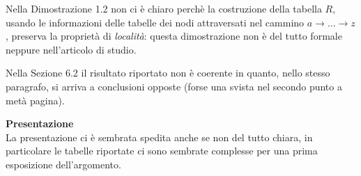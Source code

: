 \documentclass[11pt]{article}
\begin{document}
\begin{formalreport}
  Nella Dimostrazione 1.2 non ci \`e chiaro perch\`e la costruzione
  della tabella $R$, usando le informazioni delle tabelle dei nodi
  attraversati nel cammino $a \rightarrow \ldots \rightarrow z$,
  preserva la propriet\`a di \emph{localit\`a}: questa dimostrazione
  non \`e del tutto formale neppure nell'articolo di studio.

  Nella Sezione 6.2 il risultato riportato non \`e coerente in quanto,
  nello stesso paragrafo, si arriva a conclusioni opposte (forse una
  svista nel secondo punto a met\`a pagina).

  \textbf{Presentazione}\\
  La presentazione ci \`e sembrata spedita anche se non del tutto
  chiara, in particolare le tabelle riportate ci sono sembrate
  complesse per una prima esposizione dell'argomento.
 
\end{formalreport}
\end{document}
